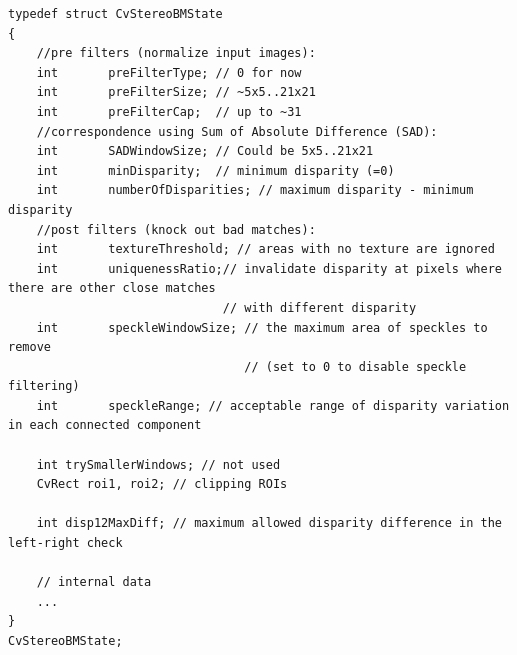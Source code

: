 \ifC
\begin{lstlisting}
typedef struct CvStereoBMState
{
    //pre filters (normalize input images):
    int       preFilterType; // 0 for now
    int       preFilterSize; // ~5x5..21x21
    int       preFilterCap;  // up to ~31
    //correspondence using Sum of Absolute Difference (SAD):
    int       SADWindowSize; // Could be 5x5..21x21
    int       minDisparity;  // minimum disparity (=0)
    int       numberOfDisparities; // maximum disparity - minimum disparity
    //post filters (knock out bad matches):
    int       textureThreshold; // areas with no texture are ignored
    int       uniquenessRatio;// invalidate disparity at pixels where there are other close matches
                              // with different disparity
    int       speckleWindowSize; // the maximum area of speckles to remove
                                 // (set to 0 to disable speckle filtering)
    int       speckleRange; // acceptable range of disparity variation in each connected component

    int trySmallerWindows; // not used
    CvRect roi1, roi2; // clipping ROIs

    int disp12MaxDiff; // maximum allowed disparity difference in the left-right check

    // internal data
    ...
}
CvStereoBMState;
\end{lstlisting}
\fi
